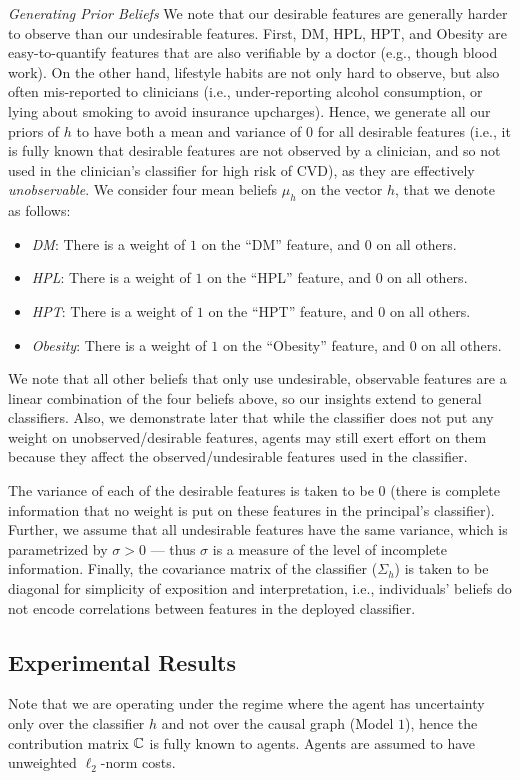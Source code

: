 \emph{Generating Prior Beliefs} We note that our desirable features are generally harder to observe than our undesirable features. First, DM, HPL, HPT, and Obesity are easy-to-quantify features that are also verifiable by a doctor (e.g., though blood work). On the other hand, lifestyle habits are not only hard to observe, but also often mis-reported to clinicians (i.e., under-reporting alcohol consumption, or lying about smoking to avoid insurance upcharges). Hence, we generate all our priors of $h$ to have both a mean and variance of $0$ for all desirable features (i.e., it is fully known that desirable features are not observed by a clinician, and so not used in the clinician's classifier for high risk of CVD), as they are effectively \emph{unobservable}. We consider four mean beliefs $\mu_h$ on the vector $h$, that we denote as follows: 
\begin{itemize}
\item \emph{DM}: There is a weight of $1$ on the ``DM'' feature, and $0$ on all others.
\item \emph{HPL}: There is a weight of $1$ on the ``HPL'' feature, and $0$ on all others.
\item \emph{HPT}: There is a weight of $1$ on the ``HPT'' feature, and $0$ on all others.
\item \emph{Obesity}: There is a weight of $1$ on the ``Obesity'' feature, and $0$ on all others.
\end{itemize}
We note that all other beliefs that only use undesirable, observable features are a linear combination of the four beliefs above, so our insights extend to general classifiers. Also, we demonstrate later that while the classifier does not put any weight on unobserved/desirable features, agents may still exert effort on them because they affect the observed/undesirable features used in the classifier. 

The variance of each of the desirable features is taken to be $0$ (there is complete information that no weight is put on these features in the principal's classifier). Further, we assume that all undesirable features have the same variance, which is parametrized by $\sigma > 0$ --- thus $\sigma$ is a measure of the level of incomplete information. Finally, the covariance matrix of the classifier ($\Sigma_h$) is taken to be diagonal for simplicity of exposition and interpretation, i.e., individuals' beliefs do not encode correlations between features in the deployed classifier.

\subsection{Experimental Results}
Note that we are operating under the regime where the agent has uncertainty only over the classifier $h$ and not over the causal graph (Model $1$), hence the contribution matrix $\mathbb{C}$ is fully known to agents. Agents are assumed to have unweighted $\ell_2$-norm costs.   


